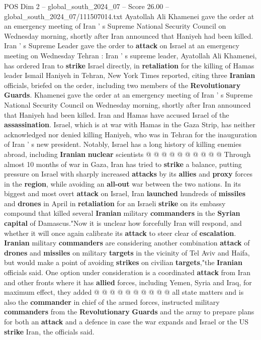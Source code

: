 \begin{textsample}{POS Dim 2 – global\_south\_2024\_07 – Score 26.00 – global\_south\_2024\_07/111507014.txt}  \label{ex:f2_pos_066}
Ayatollah Ali Khamenei gave the order at an emergency meeting of Iran ' s Supreme National Security Council on Wednesday morning, shortly after Iran announced that Haniyeh had been killed.
Iran ' s Supreme Leader gave the order to \textbf{attack} on Israel at an emergency meeting on Wednesday Tehran : Iran ' s supreme leader, Ayatollah Ali Khamenei, has ordered Iran to \textbf{strike} Israel directly, in \textbf{retaliation} for the killing of Hamas leader Ismail Haniyeh in Tehran, New York Times reported, citing three \textbf{Iranian} officials, briefed on the order, including two members of the \textbf{Revolutionary} \textbf{Guards}.
Khamenei gave the order at an emergency meeting of Iran ' s Supreme National Security Council on Wednesday morning, shortly after Iran announced that Haniyeh had been killed.
Iran and Hamas have accused Israel of the \textbf{assassination}.
Israel, which is at war with Hamas in the Gaza Strip, has neither acknowledged nor denied killing Haniyeh, who was in Tehran for the inauguration of Iran ' s new president.
Notably, Israel has a long history of killing enemies abroad, including \textbf{Iranian} \textbf{nuclear} scientists @ @ @ @ @ @ @ @ @ @ Through almost 10 months of war in Gaza, Iran has tried to \textbf{strike} a balance, putting pressure on Israel with sharply increased \textbf{attacks} by its \textbf{allies} and \textbf{proxy} forces in the \textbf{region}, while avoiding an \textbf{all-out} war between the two nations.
In its biggest and most overt \textbf{attack} on Israel, Iran \textbf{launched} hundreds of \textbf{missiles} and \textbf{drones} in April in \textbf{retaliation} for an Israeli \textbf{strike} on its embassy compound that killed several \textbf{Iranian} military \textbf{commanders} in the \textbf{Syrian} \textbf{capital} of Damascus."Now it is unclear how forcefully Iran will respond, and whether it will once again calibrate its \textbf{attack} to steer clear of \textbf{escalation}. \textbf{Iranian} military \textbf{commanders} are considering another combination \textbf{attack} of \textbf{drones} and \textbf{missiles} on military \textbf{targets} in the vicinity of Tel Aviv and Haifa, but would make a point of avoiding \textbf{strikes} on civilian \textbf{targets},"the \textbf{Iranian} officials said.
One option under consideration is a coordinated \textbf{attack} from Iran and other fronts where it has \textbf{allied} forces, including Yemen, Syria and Iraq, for maximum effect, they added @ @ @ @ @ @ @ @ @ @ all state matters and is also the \textbf{commander} in chief of the armed forces, instructed military \textbf{commanders} from the \textbf{Revolutionary} \textbf{Guards} and the army to prepare plans for both an \textbf{attack} and a defence in case the war expands and Israel or the US \textbf{strike} Iran, the officials said.

\end{textsample}
